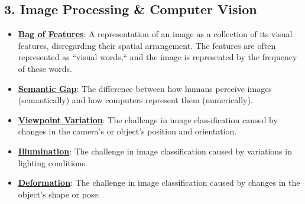 \documentclass{article}%
\begin{document}
\subsection{3. Image Processing \& Computer Vision}%
\label{subsec:3.ImageProcessingComputerVision}%
\begin{itemize}[leftmargin=*]%
\item \href{https://purdue.brightspace.com/d2l/common/assets/pdfjs-d2l-dist/1.0.14-legacy/web/viewer.html?file=\%2Fcontent\%2Fenforced\%2F1095467-wl.202510.CS.24300.001\%2F07L2-Vision.pdf\%3Fou\%3D1095467\&lang=en-us\&container=d2l-fileviewer-rendered-pdf\&fullscreen=d2l-fileviewer-rendered-pdf-dialog\&height=667#page=12}{\textbf{Bag of Features}}: A representation of an image as a collection of its visual features, disregarding their spatial arrangement. The features are often represented as ``visual words,`` and the image is represented by the frequency of these words.%
\item \href{https://purdue.brightspace.com/d2l/common/assets/pdfjs-d2l-dist/1.0.14-legacy/web/viewer.html?file=\%2Fcontent\%2Fenforced\%2F1095467-wl.202510.CS.24300.001\%2F07L2-Vision.pdf\%3Fou\%3D1095467\&lang=en-us\&container=d2l-fileviewer-rendered-pdf\&fullscreen=d2l-fileviewer-rendered-pdf-dialog\&height=667#page=4}{\textbf{Semantic Gap}}: The difference between how humans perceive images (semantically) and how computers represent them (numerically).%
\item \href{https://purdue.brightspace.com/d2l/common/assets/pdfjs-d2l-dist/1.0.14-legacy/web/viewer.html?file=\%2Fcontent\%2Fenforced\%2F1095467-wl.202510.CS.24300.001\%2F07L2-Vision.pdf\%3Fou\%3D1095467\&lang=en-us\&container=d2l-fileviewer-rendered-pdf\&fullscreen=d2l-fileviewer-rendered-pdf-dialog\&height=667#page=6}{\textbf{Viewpoint Variation}}: The challenge in image classification caused by changes in the camera's or object's position and orientation.%
\item \href{https://purdue.brightspace.com/d2l/common/assets/pdfjs-d2l-dist/1.0.14-legacy/web/viewer.html?file=\%2Fcontent\%2Fenforced\%2F1095467-wl.202510.CS.24300.001\%2F07L2-Vision.pdf\%3Fou\%3D1095467\&lang=en-us\&container=d2l-fileviewer-rendered-pdf\&fullscreen=d2l-fileviewer-rendered-pdf-dialog\&height=667#page=7}{\textbf{Illumination}}: The challenge in image classification caused by variations in lighting conditions.%
\item \href{https://purdue.brightspace.com/d2l/common/assets/pdfjs-d2l-dist/1.0.14-legacy/web/viewer.html?file=\%2Fcontent\%2Fenforced\%2F1095467-wl.202510.CS.24300.001\%2F07L2-Vision.pdf\%3Fou\%3D1095467\&lang=en-us\&container=d2l-fileviewer-rendered-pdf\&fullscreen=d2l-fileviewer-rendered-pdf-dialog\&height=667#page=8}{\textbf{Deformation}}: The challenge in image classification caused by changes in the object's shape or pose.%

\end{itemize}
\end{document}
